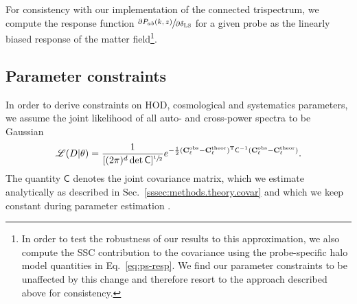 \documentclass[a4paper,11pt]{article}
\begin{document}
    For consistency with our implementation of the connected trispectrum, we compute the response function $\sfrac{\partial P_{ab}(k, z)}{\partial \delta_{\rm LS}} $ for a given probe as the linearly biased response of the matter field\footnote{In order to test the robustness of our results to this approximation, we also compute the SSC contribution to the covariance using the probe-specific halo model quantities in Eq.~\ref{eq:ps-resp}. We find our parameter constraints to be unaffected by this change and therefore resort to the approach described above for consistency.}. 

  \subsection{Parameter constraints}\label{ssec:methods.constr}
    In order to derive constraints on HOD, cosmological and systematics parameters, we assume the joint likelihood of all auto- and cross-power spectra to be Gaussian 
    \begin{align}
      \mathscr{L}(D \vert \theta) = \frac{1}{[(2\pi)^{d}\det{\mathsf{C}}]^{\sfrac{1}{2}}} e^{-\frac{1}{2}(\mathbf{C}^{\mathrm{obs}}_{\ell}-\mathbf{C}^{\mathrm{theor}}_{\ell})^{\mathrm{T}}\mathsf{C}^{-1}(\mathbf{C}^{\mathrm{obs}}_{\ell}-\mathbf{C}^{\mathrm{theor}}_{\ell})}.
      \label{eq:likelihood}
    \end{align}
    The quantity $\mathsf{C}$ denotes the joint covariance matrix, which we estimate analytically as described in Sec.~\ref{sssec:methods.theory.covar} and which we keep constant during parameter estimation \citep{2019OJAp....2E...3K}.
\end{document}

